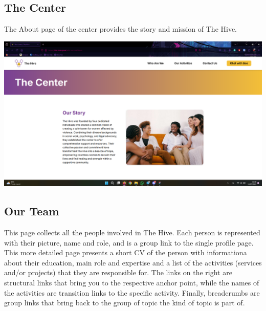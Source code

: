 \subsection{The Center}
The About page of the center provides the story and mission of The Hive.
\vspace{1em}
\begin{center}
    \includegraphics[width=0.5\linewidth]{img/design-document/website-screenshots/centerpage.png}
\end{center}

\subsection{Our Team}
This page collects all the people involved in The Hive. Each person is represented with their picture, name and role,
and is a group link to the single profile page. This more detailed page presents a short CV of the person with informationa
about their education, main role and expertise and a list of the activities (services and/or projects) that they are responsible for.
The links on the right are structural links that bring you to the respective anchor point, while the names of the activities
are transition links to the specific activity. Finally, breadcrumbs are group links that bring back to the group of topic the kind of topic is part of.

